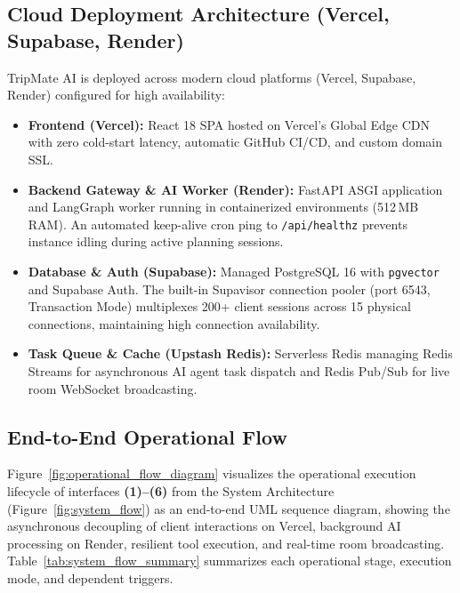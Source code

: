 \documentclass[11pt,a4paper]{article}
\begin{document}
\subsection{Cloud Deployment Architecture (Vercel, Supabase, Render)}
\label{sec:deployment_architecture}
TripMate AI is deployed across modern cloud platforms (Vercel, Supabase, Render) configured for high availability:
\begin{itemize}
\item \textbf{Frontend (Vercel):} React 18 SPA hosted on Vercel's Global Edge CDN with zero cold-start latency, automatic GitHub CI/CD, and custom domain SSL.
\item \textbf{Backend Gateway \& AI Worker (Render):} FastAPI ASGI application and LangGraph worker running in containerized environments (512\,MB RAM). An automated keep-alive cron ping to \texttt{/api/healthz} prevents instance idling during active planning sessions.
\item \textbf{Database \& Auth (Supabase):} Managed PostgreSQL 16 with \texttt{pgvector} and Supabase Auth. The built-in Supavisor connection pooler (port 6543, Transaction Mode) multiplexes 200+ client sessions across 15 physical connections, maintaining high connection availability.
\item \textbf{Task Queue \& Cache (Upstash Redis):} Serverless Redis managing Redis Streams for asynchronous AI agent task dispatch and Redis Pub/Sub for live room WebSocket broadcasting.
\end{itemize}

\clearpage
\subsection{End-to-End Operational Flow}
\label{sec:system_flow}
Figure~\ref{fig:operational_flow_diagram} visualizes the operational execution lifecycle of interfaces \textbf{(1)--(6)} from the System Architecture (Figure~\ref{fig:system_flow}) as an end-to-end UML sequence diagram, showing the asynchronous decoupling of client interactions on Vercel, background AI processing on Render, resilient tool execution, and real-time room broadcasting. Table~\ref{tab:system_flow_summary} summarizes each operational stage, execution mode, and dependent triggers.
\end{document}
